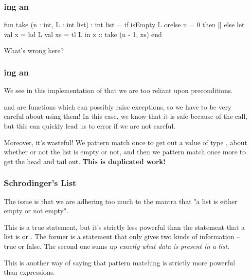 \documentclass[aspectratio=169]{beamer}
\begin{document}
\begin{frame}[fragile]
  \frametitle{ing an }

  \begin{codeblock}
    fun take (n : int, L : int list) : int list = 
      if isEmpty L orelse n = 0 then
        []
      else
        let
          val x = hd L 
          val xs = tl L 
        in
          x :: take (n - 1, xs)
        end
  \end{codeblock}

  \pause
  \vspace{\fill}

  What's wrong here?
\end{frame}

\begin{frame}[fragile]
  \frametitle{ing an }

  We see in this implementation of  that we are too reliant
  upon preconditions.

  \pause
  \vspace{\fill}

   and  are functions which can possibly raise exceptions,
  so we have to be very careful about using them! In this case, we know that
  it is safe because of the  call, but this can quickly lead
  us to error if we are not careful.

  \pause
  \vspace{\fill}

  Moreover, it's wasteful! We pattern match once to get out a value of type
  , about whether or not the list is empty or not, and then we
  pattern match once more to get the head and tail out. \textbf{This is duplicated
  work!}
\end{frame}

\begin{frame}[fragile]
  \frametitle{Schrodinger's List}

  The issue is that we are adhering too much to the mantra that "a list is
  either empty or not empty". 

  \pause
  \vspace{\fill}

  This is a true statement, but it's strictly less powerful than the statement
  that a list is \code{[]} or . The former is a statement that only
  gives two kinds of information -- true or false. The second one sums up
  \textit{exactly what data is present in a list}. 

  \pause
  \vspace{\fill}

  This is another way of saying that pattern matching is strictly more powerful
  than  expressions.
\end{frame}
\end{document}
